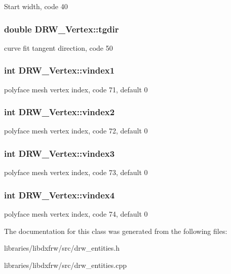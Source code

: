 Start width, code 40 \hypertarget{classDRW__Vertex_ab94318addec1b5ca507a11cf8dd04b34}{
\subsubsection[{tgdir}]{\setlength{\rightskip}{0pt plus 5cm}double D\-R\-W\-\_\-\-Vertex\-::tgdir}}\label{classDRW__Vertex_ab94318addec1b5ca507a11cf8dd04b34}
curve fit tangent direction, code 50 \hypertarget{classDRW__Vertex_aff58612a8e14eb93c6c7667fa19f087b}{
\subsubsection[{vindex1}]{\setlength{\rightskip}{0pt plus 5cm}int D\-R\-W\-\_\-\-Vertex\-::vindex1}}\label{classDRW__Vertex_aff58612a8e14eb93c6c7667fa19f087b}
polyface mesh vertex index, code 71, default 0 \hypertarget{classDRW__Vertex_a48f459a7d3627c898fa9e1be5b0de6d6}{
\subsubsection[{vindex2}]{\setlength{\rightskip}{0pt plus 5cm}int D\-R\-W\-\_\-\-Vertex\-::vindex2}}\label{classDRW__Vertex_a48f459a7d3627c898fa9e1be5b0de6d6}
polyface mesh vertex index, code 72, default 0 \hypertarget{classDRW__Vertex_a43d78abe4c3bacad98ef2a65216e225e}{
\subsubsection[{vindex3}]{\setlength{\rightskip}{0pt plus 5cm}int D\-R\-W\-\_\-\-Vertex\-::vindex3}}\label{classDRW__Vertex_a43d78abe4c3bacad98ef2a65216e225e}
polyface mesh vertex index, code 73, default 0 \hypertarget{classDRW__Vertex_a1f2c2a799721fe8e6290c6121c190ad8}{
\subsubsection[{vindex4}]{\setlength{\rightskip}{0pt plus 5cm}int D\-R\-W\-\_\-\-Vertex\-::vindex4}}\label{classDRW__Vertex_a1f2c2a799721fe8e6290c6121c190ad8}
polyface mesh vertex index, code 74, default 0 

The documentation for this class was generated from the following files\-:\begin{DoxyCompactItemize}
\item 
libraries/libdxfrw/src/drw\-\_\-entities.\-h\item 
libraries/libdxfrw/src/drw\-\_\-entities.\-cpp\end{DoxyCompactItemize}

